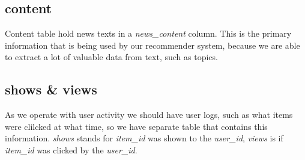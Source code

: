 \documentclass{article}
\begin{document}


\subsection*{content}

Content table hold news texts in a \textit{news\_content} column. This is the primary information that is being used by our recommender system, because we are able to extract a lot of valuable data from text, such as topics.

\begin{table}[h]
    \centering
    \caption{news item}
    \label{tab:item}
\end{table}

\subsection*{shows \& views}

As we operate with user activity we should have user logs, such as what items were clilcked at what time, so we have separate table that contains this information.    \emph{shows} stands for \emph{item\_id} was shown to the \emph{user\_id}, \emph{views} is if \emph{item\_id} was clicked by the \emph{user\_id}.
\end{document}
